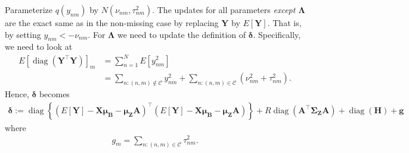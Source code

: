 \documentclass[11pt,authoryear]{article}
\DeclareMathOperator*{\diag}{diag}
\newcommand{\bs}[1]{\boldsymbol{#1}}
\begin{document}
Parameterize $q(y_{nm})$ by $N(\nu_{nm}, \tau_{nm}^2)$. The updates for all parameters \emph{except $\bs{\Lambda}$} are the exact same as in the non-missing case by replacing $\bs{Y}$ by $E[\bs{Y}]$. That is, by setting $y_{nm} <- \nu_{nm}$. For $\bs{\Lambda}$ we need to update the definition of $\bs{\delta}$. Specifically, we need to look at
\begin{align}
E[\diag(\bs{Y}^{\intercal}\bs{Y})]_{m} &= \sum_{n = 1}^N E[y_{nm}^2]\\
&= \sum_{n: (n, m)\notin\mathcal{C}} y_{nm}^2 + \sum_{n: (n, m) \in \mathcal{C}} (\nu_{nm}^2 + \tau_{nm}^2).
\end{align}
Hence, $\bs{\delta}$ becomes
\begin{align}
\label{equation:delta.missing}
\bs{\delta} := \diag\left\{(E[\bs{Y}]-\bs{X}\bs{\mu}_{\bs{B}} - \bs{\mu}_{\bs{Z}}\bs{A})^{\intercal}(E[\bs{Y}]-\bs{X}\bs{\mu}_{\bs{B}} - \bs{\mu}_{\bs{Z}}\bs{A})\right\} + R\diag(\bs{A}^{\intercal}\bs{\Sigma}_{\bs{Z}}\bs{A}) + \diag(\bs{H}) + \bs{g}
\end{align}
where
\begin{align}
g_{m} = \sum_{n: (n, m) \in \mathcal{C}} \tau_{nm}^2.
\end{align}
\end{document}
